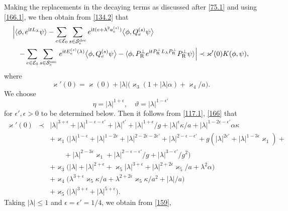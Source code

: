\documentclass[letterpaper,onecolumn,11pt,accepted=2021-12-09]{quantumarticle}
\numberwithin{equation}{section}
\newcommand{\aes}{a_e^{(s)}}
\newcommand{\Qes}{Q_e^{(s)}}
\newcommand{\Ees}{E_e^{(s)}(\lambda)}
\renewcommand{\r}{{\rm R}}
\renewcommand{\i}{{\rm i}}
\begin{document}
Making the replacements in the decaying terms as discussed after \eqref{75.1} and using \eqref{166.1}, we then obtain  from \eqref{134.2} that  
\begin{eqnarray}
\lefteqn{
	\Big| \langle\phi, e^{\i tL_\lambda}\psi\rangle  - \sum_{e\in{\mathcal E}_0}\sum_{s\in{\mathcal S}_e^{\rm dec}} e^{\i t (e+\lambda^2 \aes)} \big\langle\phi, \Qes\psi\big\rangle}\nonumber	\\
&& -\sum_{e\in{\mathcal E}_0}\sum_{s\in{\mathcal S}_e^{\rm osc}}  \, e^{\i t \Ees}\big\langle \phi, \Qes\psi\big\rangle
 -\langle \phi, P^\perp_\r e^{\i t P^\perp_\r L_\lambda P^\perp_\r} P^\perp_\r \psi\rangle \Big| \prec \varkappa'(0) K(\phi,\psi),
 \label{76}
\end{eqnarray}
where
\begin{equation}
\varkappa'(0) = \varkappa(0) + |\lambda|\big( \varkappa_3(1+|\lambda|\alpha)+ \varkappa_4/a\big).
\label{166}
\end{equation}
We choose
\begin{equation}
	\eta = |\lambda|^{1+\epsilon}, \quad \vartheta = |\lambda|^{1-\epsilon'}
	\label{73}
\end{equation}
for $\epsilon',\epsilon>0$ to be determined below. Then it follows from \eqref{117.1}, \eqref{166} that
\begin{eqnarray}
\varkappa'(0) &\prec&  |\lambda|^{3+\epsilon} +|\lambda|^{1-\epsilon-\epsilon'} +|\lambda|^{\epsilon'} + |\lambda|^{1+\epsilon}/g +|\lambda|^\epsilon \kappa/a +  |\lambda|^{1-2\epsilon-\epsilon'} \alpha\kappa \nonumber\\
&&+ \varkappa_1\Big(  |\lambda|^{1-\epsilon}+|\lambda|^{1-2\epsilon} + |\lambda|^{2-2\epsilon-2\epsilon'}+ |\lambda|^{2-\epsilon-\epsilon'} +g( |\lambda|^{2\epsilon'}+|\lambda|^{1-3\epsilon}\varkappa_1)  +\nonumber\\
&& \qquad +|\lambda|^{2-3\epsilon}\varkappa_1+ |\lambda|^{2-\epsilon-\epsilon'}/g +|\lambda|^{3-\epsilon'}/g^2 \Big)\nonumber\\
&& + \varkappa_3 \Big( |\lambda|+|\lambda|^{2+\epsilon} +\varkappa_5|\lambda|^{3+\epsilon} +|\lambda|^{2+2\epsilon}\varkappa_5/a+\lambda^2\alpha
\Big)\nonumber\\
&& + \varkappa_4\Big(\lambda^{3+\epsilon} \varkappa_5\kappa/a + \lambda^{2+2\epsilon}\varkappa_5\kappa/a^2 +|\lambda|/a\Big) \nonumber\\
&&+ \varkappa_5\Big( |\lambda|^{3+\epsilon} + |\lambda|^{5+\epsilon}\Big). 
\label{159}
\end{eqnarray}
Taking $|\lambda|\le1$ and $\epsilon=\epsilon'=1/4$, we obtain from \eqref{159}, 
\end{document}
